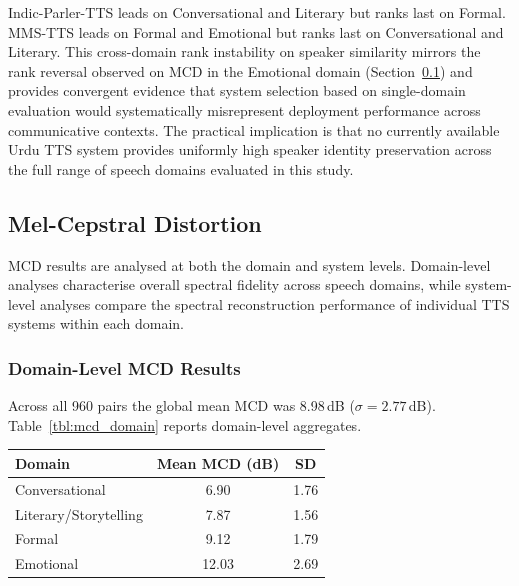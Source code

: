 \documentclass[a4paper,fleqn]{cas-dc}
\begin{document}
    
    \hspace*{1.2em} Indic-Parler-TTS leads on Conversational and Literary but
    ranks last on Formal. MMS-TTS leads on Formal and Emotional but ranks
    last on Conversational and Literary. This cross-domain rank instability
    on speaker similarity mirrors the rank reversal observed on MCD in the
    Emotional domain (Section~\ref{sec:results-mcd}) and provides
    convergent evidence that system selection based on single-domain
    evaluation would systematically misrepresent deployment performance
    across communicative contexts. The practical implication is that no
    currently available Urdu TTS system provides uniformly high speaker
    identity preservation across the full range of speech domains evaluated
    in this study.
    
    \subsection{Mel-Cepstral Distortion}\label{sec:results-mcd}
    \hspace*{1.2em} MCD results are analysed at both the domain and system levels. Domain-level analyses characterise overall spectral fidelity across speech domains, while system-level analyses compare the spectral reconstruction performance of individual TTS systems within each domain.

    \subsubsection{Domain-Level MCD Results}
    
    \hspace*{1.2em} Across all 960 pairs the global mean MCD was 8.98\,dB
    ($\sigma = 2.77$\,dB). Table~\ref{tbl:mcd_domain} reports domain-level
    aggregates.
    
    \begin{center}
    \label{tbl:mcd_domain}
    \small
    \begin{tabular*}{\columnwidth}{@{\extracolsep{\fill}}lcc@{}}
    \toprule
    \textbf{Domain} & \textbf{Mean MCD (dB)} & \textbf{SD} \\
    \midrule
    Conversational        & 6.90 & 1.76 \\
    Literary/Storytelling & 7.87 & 1.56 \\
    Formal                & 9.12 & 1.79 \\
    Emotional             & 12.03 & 2.69 \\
    \bottomrule
    \end{tabular*}
    \end{center}
    
\end{document}
